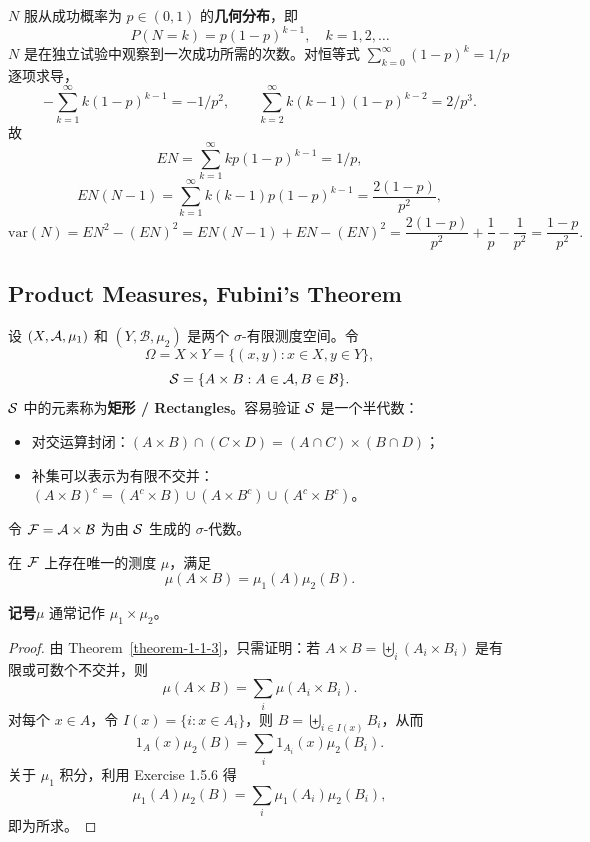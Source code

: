 \begin{example}\label{example-1-6-14}
    $N$ 服从成功概率为 $p \in (0,1)$ 的\textbf{几何分布}，即
    \[
        P(N = k) = p(1-p)^{k-1}, \quad k = 1, 2, \ldots
    \]
    $N$ 是在独立试验中观察到一次成功所需的次数。对恒等式 $\sum_{k=0}^{\infty} (1-p)^k = 1/p$ 逐项求导，
    \[
        -\sum_{k=1}^{\infty} k(1-p)^{k-1} = -1/p^2, \qquad \sum_{k=2}^{\infty} k(k-1)(1-p)^{k-2} = 2/p^3.
    \]
    故
    \[
        EN = \sum_{k=1}^{\infty} kp(1-p)^{k-1} = 1/p,
    \]
    \[
        EN(N-1) = \sum_{k=1}^{\infty} k(k-1)p(1-p)^{k-1} = \frac{2(1-p)}{p^2},
    \]
    \[
        \mathrm{var}(N) = EN^2 - (EN)^2 = EN(N-1) + EN - (EN)^2 = \frac{2(1-p)}{p^2} + \frac{1}{p} - \frac{1}{p^2} = \frac{1-p}{p^2}.
    \]
\end{example}

\subsection{Product Measures, Fubini's Theorem}

设 $(X, \mathcal{A}, \mu_1)$ 和 $(Y, \mathcal{B}, \mu_2)$ 是两个 $\sigma$-有限测度空间。令
\[
    \Omega = X \times Y = \{(x,y) : x \in X, y \in Y\},
\]
\[
    \mathcal{S} = \{A \times B : A \in \mathcal{A}, B \in \mathcal{B}\}.
\]
$\mathcal{S}$ 中的元素称为{\normalfont\bfseries 矩形 / Rectangles}。容易验证 $\mathcal{S}$ 是一个半代数：
\begin{itemize}
    \item 对交运算封闭：$(A \times B) \cap (C \times D) = (A \cap C) \times (B \cap D)$；
    \item 补集可以表示为有限不交并：$(A \times B)^c = (A^c \times B) \cup (A \times B^c) \cup (A^c \times B^c)$。
\end{itemize}
令 $\mathcal{F} = \mathcal{A} \times \mathcal{B}$ 为由 $\mathcal{S}$ 生成的 $\sigma$-代数。

\begin{theorem}\label{theorem-1-7-1}
    在 $\mathcal{F}$ 上存在唯一的测度 $\mu$，满足
    \[
        \mu(A \times B) = \mu_1(A)\mu_2(B).
    \]
\end{theorem}

\textbf{记号}\quad $\mu$ 通常记作 $\mu_1 \times \mu_2$。

\begin{proof}
    由 Theorem~\ref{theorem-1-1-3}，只需证明：若 $A \times B = \biguplus_i (A_i \times B_i)$ 是有限或可数个不交并，则
    \[
        \mu(A \times B) = \sum_i \mu(A_i \times B_i).
    \]
    对每个 $x \in A$，令 $I(x) = \{i : x \in A_i\}$，则 $B = \biguplus_{i \in I(x)} B_i$，从而
    \[
        1_A(x)\mu_2(B) = \sum_i 1_{A_i}(x)\mu_2(B_i).
    \]
    关于 $\mu_1$ 积分，利用 Exercise 1.5.6 得
    \[
        \mu_1(A)\mu_2(B) = \sum_i \mu_1(A_i)\mu_2(B_i),
    \]
    即为所求。
\end{proof}


